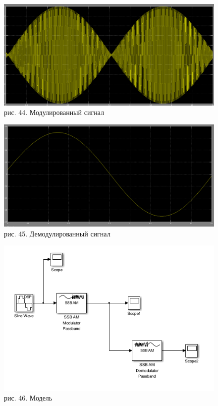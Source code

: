 \documentclass[10pt,a4paper]{report}
\begin{document}
\begin{figure}
\begin{center}
\includegraphics[width=150mm, scale = 0.9]{7_16.png}\newline
рис. 44. Модулированный сигнал\newline
\end{center}
\end{figure}
\begin{figure}
\begin{center}
\includegraphics[width=150mm, scale = 0.9]{7_17}\newline
рис. 45. Демодулированный сигнал\newline
\end{center}
\end{figure}
\begin{figure}
\begin{center}
\includegraphics[width=150mm, scale = 0.9]{7_18}\newline
рис. 46. Модель\newline
\end{center}
\end{figure}
\end{document}
